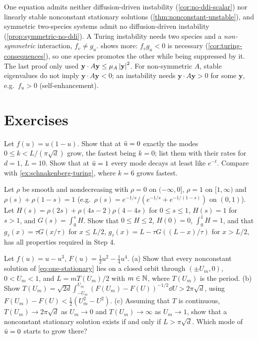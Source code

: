 \begin{remark}\label{rem:why-two}
One equation admits neither diffusion-driven instability (\cref{cor:no-ddi-scalar})
nor linearly stable nonconstant stationary solutions (\cref{thm:nonconstant-unstable}),
and symmetric two-species systems admit no diffusion-driven instability
(\cref{prop:symmetric-no-ddi}). A Turing instability needs two species and a
\emph{non-symmetric} interaction, $f_v\neq g_u$.  shows more:
$f_vg_u<0$ is necessary (\cref{cor:turing-consequences}), so one species promotes the
other while being suppressed by it. The last proof only used
$\mathbf y\cdot A\mathbf y\le\mu_A\left\lvert \mathbf y\right\rvert^2$. For non-symmetric $A$, stable
eigenvalues do not imply $\mathbf y\cdot A\mathbf y<0$; an instability needs
$\mathbf y\cdot A\mathbf y>0$ for some $\mathbf y$, e.g.\ $f_u>0$ (self-enhancement).
\end{remark}

\section{Exercises}\label{sec:one-exercises}

\begin{exercise}\label{exer:one-fisher}
Let $f(u)=u(1-u)$. Show that at $\bar u=0$ exactly the modes $0\le k<L/(\pi\sqrt d)$ grow,
the fastest being $k=0$; list them with their rates for $d=1$, $L=10$. Show that at
$\bar u=1$ every mode decays at least like $e^{-t}$. Compare with
\cref{ex:schnakenberg-turing}, where $k=6$ grows fastest.
\end{exercise}

\begin{exercise}\label{exer:one-g-delta}
Let $\rho$ be smooth and nondecreasing with $\rho=0$ on $(-\infty,0]$, $\rho=1$ on
$[1,\infty)$ and $\rho(s)+\rho(1-s)=1$ (e.g.\
$\rho(s)=e^{-1/s}/(e^{-1/s}+e^{-1/(1-s)})$ on $(0,1)$). Let
$H(s)=\rho(2s)+\rho(4s-2)\rho(4-4s)$ for $0\le s\le1$, $H(s)=1$ for $s>1$, and
$G(s)=\int_0^sH$. Show that $0\le H\le2$, $H(0)=0$, $\int_0^1H=1$, and that
$g_\tau(x)=\tau G(x/\tau)$ for $x\le L/2$, $g_\tau(x)=L-\tau G((L-x)/\tau)$
for $x>L/2$, has all properties required in Step 4.
\end{exercise}

\begin{exercise}[$\ast$]\label{exer:one-minimal-length}
Let $f(u)=u-u^3$, $F(u)=\frac12u^2-\frac14u^4$. (a) Show that every nonconstant
solution of \eqref{eq:one-stationary} lies on a closed orbit through $(\pm U_m,0)$,
$0<U_m<1$, and $L=mT(U_m)/2$ with $m\in\mathbb{N}$, where $T(U_m)$ is the period.
(b) Show $T(U_m)=\sqrt{2d}\int_{-U_m}^{U_m}(F(U_m)-F(U))^{-1/2}\dd U>2\pi\sqrt d$, using
$F(U_m)-F(U)<\frac12(U_m^2-U^2)$. (c) Assuming that $T$ is continuous,
$T(U_m)\to2\pi\sqrt d$ as $U_m\to0$ and $T(U_m)\to\infty$ as $U_m\to1$, show that a
nonconstant stationary solution exists if and only if $L>\pi\sqrt d$. Which mode of
$\bar u=0$ starts to grow there?
\end{exercise}

